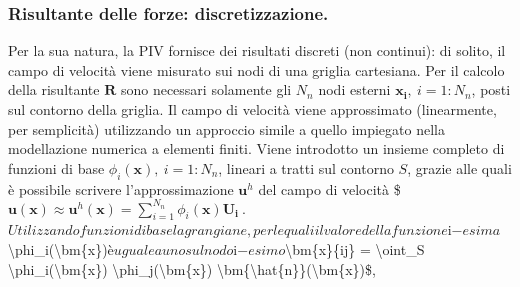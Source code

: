 \documentclass[letterpaper,10pt,italian]{jupyterBook}
\begin{document}
\subsubsection{Risultante delle forze: discretizzazione.}
\label{\detokenize{polimi/fluidmechanics-ita/template/capitoli/04_bilanci/0401SciaExp:risultante-delle-forze-discretizzazione}}
\sphinxAtStartPar
Per la sua natura, la PIV fornisce dei risultati discreti (non
continui): di solito, il campo di velocità viene misurato sui nodi di
una griglia cartesiana. Per il calcolo della risultante \(\bm{R}\) sono
necessari solamente gli \(N_n\) nodi esterni \(\bm{x_i}, \ i=1:N_n\), posti
sul contorno della griglia. Il campo di velocità viene approssimato
(linearmente, per semplicità) utilizzando un approccio simile a quello
impiegato nella modellazione numerica a elementi finiti. Viene
introdotto un insieme completo di funzioni di base
\(\phi_i(\bm{x}), \ i=1:N_{n}\), lineari a tratti sul contorno \(S\), grazie
alle quali è possibile scrivere l’approssimazione \(\bm{u}^h\) del campo
di velocità \$\(\label{exp:u:fem-exp}
 \bm{u}(\bm{x}) \approx \bm{u}^h(\bm{x}) = \displaystyle\sum_{i=1}^{N_n} \phi_i(\bm{x}) \bm{U_i} \ .\)\(
Utilizzando funzioni di base lagrangiane, per le quali il valore della
funzione \)i\(-esima \)\textbackslash{}phi\_i(\textbackslash{}bm\{x\})\( è uguale a uno sul nodo \)i\(-esimo
\)\textbackslash{}bm\{x\}\{ij\} = \textbackslash{}oint\_S  \textbackslash{}phi\_i(\textbackslash{}bm\{x\}) \textbackslash{}phi\_j(\textbackslash{}bm\{x\}) \textbackslash{}bm\{\textbackslash{}hat\{n\}\}(\textbackslash{}bm\{x\})\$,
\end{document}
